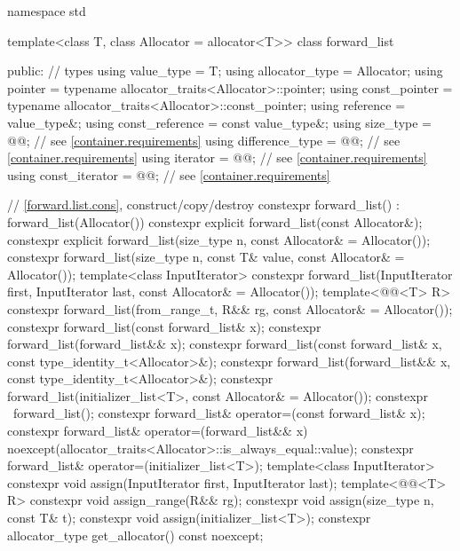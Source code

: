 \begin{codeblock}
namespace std {
  template<class T, class Allocator = allocator<T>>
  class forward_list {
  public:
    // types
    using value_type      = T;
    using allocator_type  = Allocator;
    using pointer         = typename allocator_traits<Allocator>::pointer;
    using const_pointer   = typename allocator_traits<Allocator>::const_pointer;
    using reference       = value_type&;
    using const_reference = const value_type&;
    using size_type       = @@; // see \ref{container.requirements}
    using difference_type = @@; // see \ref{container.requirements}
    using iterator        = @@; // see \ref{container.requirements}
    using const_iterator  = @@; // see \ref{container.requirements}

    // \ref{forward.list.cons}, construct/copy/destroy
    constexpr forward_list() : forward_list(Allocator()) { }
    constexpr explicit forward_list(const Allocator&);
    constexpr explicit forward_list(size_type n, const Allocator& = Allocator());
    constexpr forward_list(size_type n, const T& value, const Allocator& = Allocator());
    template<class InputIterator>
      constexpr forward_list(InputIterator first, InputIterator last,
                             const Allocator& = Allocator());
    template<@@<T> R>
      constexpr forward_list(from_range_t, R&& rg, const Allocator& = Allocator());
    constexpr forward_list(const forward_list& x);
    constexpr forward_list(forward_list&& x);
    constexpr forward_list(const forward_list& x, const type_identity_t<Allocator>&);
    constexpr forward_list(forward_list&& x, const type_identity_t<Allocator>&);
    constexpr forward_list(initializer_list<T>, const Allocator& = Allocator());
    constexpr ~forward_list();
    constexpr forward_list& operator=(const forward_list& x);
    constexpr forward_list& operator=(forward_list&& x)
      noexcept(allocator_traits<Allocator>::is_always_equal::value);
    constexpr forward_list& operator=(initializer_list<T>);
    template<class InputIterator>
      constexpr void assign(InputIterator first, InputIterator last);
    template<@@<T> R>
      constexpr void assign_range(R&& rg);
    constexpr void assign(size_type n, const T& t);
    constexpr void assign(initializer_list<T>);
    constexpr allocator_type get_allocator() const noexcept;

}}
\end{codeblock}
